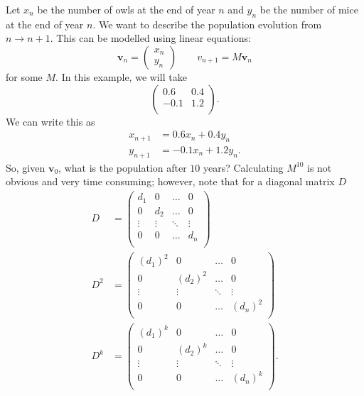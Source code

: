 \begin{example}
    Let $x_n$ be the number of owls at the end of year $n$ and $y_n$ be the number of mice at the end of year $n$. We want to describe the population evolution from $n \to n + 1$. This can be modelled using linear equations: 
    \[
        \bm{v}_n =
        \begin{pmatrix}
            x_n \\ y_n
        \end{pmatrix}
        \qquad
        v_{n + 1} = M \bm{v}_n
    \]
    for some $M$. In this example, we will take 
    \[
        \begin{pmatrix}
            0.6 & 0.4 \\
            -0.1 & 1.2 \\
        \end{pmatrix}
        .
    \]
    We can write this as
    \begin{align*}
        x_{n + 1} &= 0.6 x_n + 0.4 y_n \\
        y_{n + 1} &= -0.1 x_n + 1.2 y_n.
    \end{align*}
    So, given $\bm{v}_0$, what is the population after $10$ years? Calculating $M^{10}$ is not obvious and very time consuming; however, note that for a diagonal matrix $D$ 
    \begin{align*}
        D &= 
        \begin{pmatrix}
            d_1 & 0 & \ldots & 0 \\
            0 & d_2 & \ldots & 0 \\
            \vdots & \vdots & \ddots & \vdots \\
            0 & 0 & \ldots & d_n \\
        \end{pmatrix}
        \\
        D^2 &= 
        \begin{pmatrix}
            (d_1)^2 & 0 & \ldots & 0 \\
            0 & (d_2)^2 & \ldots & 0 \\
            \vdots & \vdots & \ddots & \vdots \\
            0 & 0 & \ldots & (d_n)^2 \\
        \end{pmatrix}
        \\
        D^k &=
        \begin{pmatrix}
            (d_1)^k & 0 & \ldots & 0 \\
            0 & (d_2)^k & \ldots & 0 \\
            \vdots & \vdots & \ddots & \vdots \\
            0 & 0 & \ldots & (d_n)^k \\
        \end{pmatrix}
        .
    \end{align*}
\end{example}

